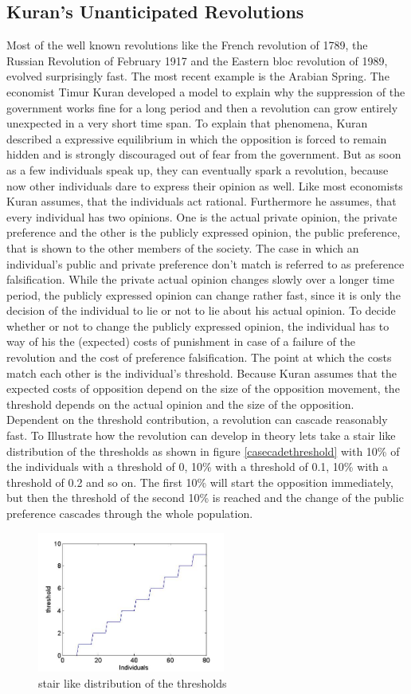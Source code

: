 

\subsection{Kuran's Unanticipated Revolutions} 
\label{sec:Kuran}

Most of the well known revolutions like the French revolution of 1789, the Russian Revolution of February 1917 and the Eastern bloc revolution of 1989, evolved surprisingly fast. The most recent example is the Arabian Spring. The economist Timur Kuran developed a model to explain why the suppression of the government works fine for a long period and then a revolution can grow entirely unexpected in a very short time span. \cite{Kuran_1989}
To explain that phenomena, Kuran described a expressive equilibrium in which the opposition is forced to remain hidden and is strongly discouraged out of fear from the government. But as soon as a few individuals speak up, they can eventually spark a revolution, because now other individuals dare to express their opinion as well.
Like most economists Kuran assumes, that the individuals act rational. Furthermore he assumes, that every individual has two opinions. One is the actual private opinion, the private preference and the other is the publicly expressed opinion, the public preference, that is shown to the other members of the society. The case in which an individual's public and private preference don't match is referred to as preference falsification. While the private actual opinion changes slowly over a longer time period, the publicly expressed opinion can change rather fast, since it is only the decision of the individual to lie or not to lie about his actual opinion. 
To decide whether or not to change the publicly expressed opinion, the individual has to way of his the (expected) costs of punishment in case of a failure of the revolution and the cost of preference falsification. The point at which the costs match each other is the individual's threshold.  Because Kuran assumes that the expected costs of opposition depend on the size of the opposition movement, the threshold depends on the actual opinion and the size of the opposition. Dependent on the threshold contribution, a revolution can cascade reasonably fast. \cite{Donnay_2011}
To Illustrate how the revolution can develop in theory lets take a stair like distribution of the thresholds as shown in figure \ref{casecadethreshold} with 10\% of the individuals with a threshold of 0, 10\% with a threshold of 0.1, 10\% with a threshold of 0.2 and so on. The first 10\% will start the opposition immediately, but then the threshold of the second 10\% is reached and the change of the public preference cascades through the whole population.
\begin{figure}[!b]
\centering
\includegraphics[width=0.55\textwidth, keepaspectratio=true]{cascadethresholddistripution.jpg}
\caption{stair like distribution of the thresholds}
\label{cascadethreshold}
\end{figure}
